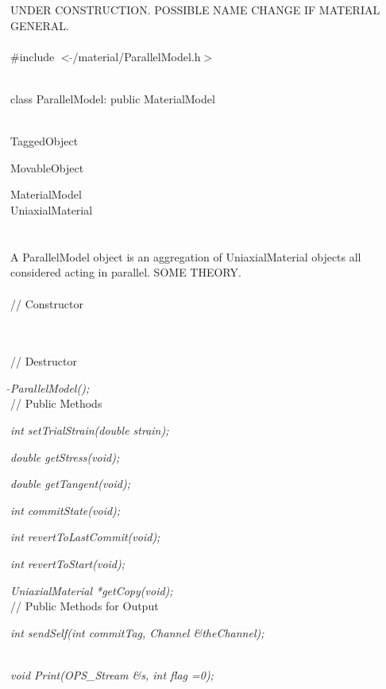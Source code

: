
UNDER CONSTRUCTION. POSSIBLE NAME CHANGE IF MATERIAL GENERAL.\\

   \\
\#include $<\tilde{ }$/material/ParallelModel.h$>$  


  \\
class ParallelModel: public MaterialModel 


 \\
TaggedObject 

MovableObject 

\indent\indent MaterialModel \\
\indent\indent\indent UniaxialMaterial \\
\indent\indent\indent{} \\

  \\
\indent A ParallelModel object is an aggregation of
UniaxialMaterial objects all considered acting in parallel. SOME
THEORY. \\ 

 \\
// Constructor 

  \\ \\
// Destructor 

{\em $\tilde{ }$ParallelModel();}\\ 

// Public Methods 

{\em int setTrialStrain(double strain); } 

{\em double getStress(void); } 

{\em double getTangent(void); } 

{\em int commitState(void); } 

{\em int revertToLastCommit(void); } 

{\em int revertToStart(void); } 

{\em UniaxialMaterial *getCopy(void); } \\ 

// Public Methods for Output

{\em    int sendSelf(int commitTag, Channel \&theChannel); }

\\
{\em    void Print(OPS_Stream \&s, int flag =0);} 



